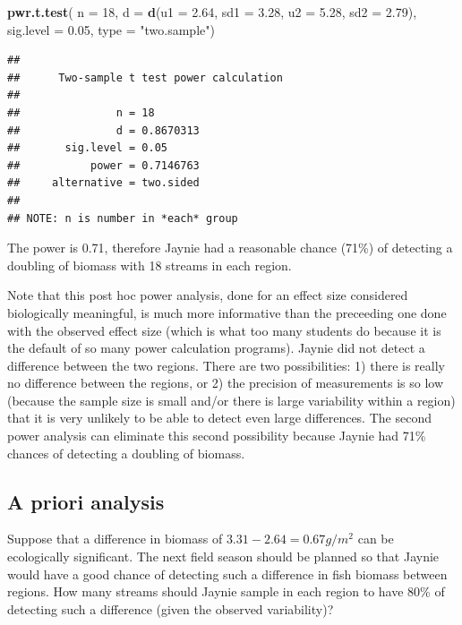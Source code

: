 \documentclass[
  12pt,
]{book}
\newenvironment{Shaded}{\begin{snugshade}}{\end{snugshade}}
\newcommand{\DataTypeTok}[1]{\textcolor[rgb]{0.13,0.29,0.53}{#1}}
\newcommand{\DecValTok}[1]{\textcolor[rgb]{0.00,0.00,0.81}{#1}}
\newcommand{\FloatTok}[1]{\textcolor[rgb]{0.00,0.00,0.81}{#1}}
\newcommand{\KeywordTok}[1]{\textcolor[rgb]{0.13,0.29,0.53}{\textbf{#1}}}
\newcommand{\NormalTok}[1]{#1}
\newcommand{\StringTok}[1]{\textcolor[rgb]{0.31,0.60,0.02}{#1}}
\begin{document}
\begin{Shaded}
\begin{Highlighting}[]
\KeywordTok{pwr.t.test}\NormalTok{(}
  \DataTypeTok{n =} \DecValTok{18}\NormalTok{,}
  \DataTypeTok{d =} \KeywordTok{d}\NormalTok{(}\DataTypeTok{u1 =} \FloatTok{2.64}\NormalTok{, }\DataTypeTok{sd1 =} \FloatTok{3.28}\NormalTok{, }\DataTypeTok{u2 =} \FloatTok{5.28}\NormalTok{, }\DataTypeTok{sd2 =} \FloatTok{2.79}\NormalTok{),}
  \DataTypeTok{sig.level =} \FloatTok{0.05}\NormalTok{,}
  \DataTypeTok{type =} \StringTok{"two.sample"}\NormalTok{)}
\end{Highlighting}
\end{Shaded}

\begin{verbatim}
## 
##      Two-sample t test power calculation 
## 
##               n = 18
##               d = 0.8670313
##       sig.level = 0.05
##           power = 0.7146763
##     alternative = two.sided
## 
## NOTE: n is number in *each* group
\end{verbatim}

The power is 0.71, therefore Jaynie had a reasonable chance (71\%) of detecting a doubling of biomass with 18 streams in each region.

Note that this post hoc power analysis, done for an effect size considered biologically meaningful, is much more informative than the preceeding one done with the observed effect size (which is what too many students do because it is the default of so many power calculation programs). Jaynie did not detect a difference between the two regions. There are two possibilities: 1) there is really no difference between the regions, or 2) the precision of measurements is so low (because the sample size is small and/or there is large variability within a region) that it is very unlikely to be able to detect even large differences. The second power analysis can eliminate this second possibility because Jaynie had 71\% chances of detecting a doubling of biomass.

\hypertarget{a-priori-analysis}{%
\subsection{A priori analysis}\label{a-priori-analysis}}

Suppose that a difference in biomass of \(3.31-2.64 = 0.67 g/m^2\) can be ecologically significant. The next field season should be planned so that Jaynie would have a good chance of detecting such a difference in fish biomass between regions. How many streams should Jaynie sample in each region to have 80\% of detecting such a difference (given the observed variability)?
\end{document}
